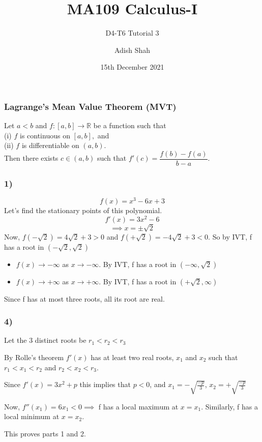 \documentclass[handout]{beamer}
\title[MA109 Calculus-I] %
{MA109 Calculus-I}
\subtitle{D4-T6 Tutorial 3}
\author[Adish Shah] %
{Adish Shah}
\date[18th December 2021] %
{15th December 2021}
\begin{document}
\frame{\titlepage}

\begin{frame}
    \frametitle{{Lagrange's Mean Value Theorem (MVT)}}
	\begin{theorem}[MVT]
		Let $a < b$ and $f:[a, b] \to \mathbb{R}$ be a function such that\\
		(i) $f$ is continuous on $[a, b],$ and\\
		(ii) $f$ is differentiable on $(a, b).$\\
		Then there exists $c \in (a, b)$ such that $f'(c) = \dfrac{f(b) - f(a)}{b - a}.$
	\end{theorem}
\end{frame}

\begin{frame}
\frametitle{1)}
\[f(x) = x^{3} - 6x+3\]
Let's find the stationary points of this polynomial.
\[f'(x) = 3x^{2}-6\]
\[\implies x = \pm \sqrt{2} \]
Now, \(f(-\sqrt{2}) = 4\sqrt{2}+3 > 0 \) and \(f(+\sqrt{2}) = -4\sqrt{2}+3 < 0 \). So by IVT, f has a root in 
$\left(-\sqrt{2},\sqrt{2}\right)$
\begin{itemize}
    \item<1-> \(f(x) \rightarrow -\infty\) as \(x \rightarrow -\infty \). By IVT, f has a root in $\left(-\infty,\sqrt{2}\right)$
    \item<2-> \(f(x) \rightarrow +\infty\) as \(x \rightarrow +\infty \). By IVT, f has a root in $\left(+\sqrt{2},\infty \right)$
\end{itemize}
Since f has at most three roots, all its root are real.
\end{frame}

\begin{frame}
\frametitle{4)}
Let the 3 distinct roots be $r_{1} < r_{2} < r_{3} $

By Rolle’s theorem $f'(x)$ has at
least two real roots, $x_{1}$ and $x_{2}$ such that $r_{1} < x_{1} < r_{2} $ and $r_{2} < x_{2} < r_{3} $.

Since $f'(x) = 3x^{2} + p$ this implies that $p < 0$, and $x_{1} = -\sqrt{\frac{-p}{3}}$,
$x_{2} = +\sqrt{\frac{-p}{3}}$

Now, $f''(x_{1} ) = 6x_{1} < 0 \implies$  f has a local maximum at $x=x_{1}$.
Similarly, f has a local minimum at $x=x_{2}$. 

This proves parts 1 and 2.
\end{frame}
\end{document}
